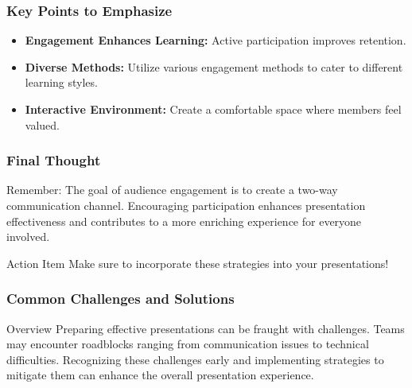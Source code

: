 \documentclass[aspectratio=169]{beamer}
\begin{document}
\begin{frame}[fragile]
    \frametitle{Key Points to Emphasize}
    \begin{itemize}
        \item \textbf{Engagement Enhances Learning:} Active participation improves retention.
        \item \textbf{Diverse Methods:} Utilize various engagement methods to cater to different learning styles.
        \item \textbf{Interactive Environment:} Create a comfortable space where members feel valued.
    \end{itemize}
\end{frame}

\begin{frame}[fragile]
    \frametitle{Final Thought}
    Remember: The goal of audience engagement is to create a two-way communication channel. Encouraging participation enhances presentation effectiveness and contributes to a more enriching experience for everyone involved.

    \begin{block}{Action Item}
        Make sure to incorporate these strategies into your presentations!
    \end{block}
\end{frame}

\begin{frame}[fragile]
    \frametitle{Common Challenges and Solutions}
    \begin{block}{Overview}
        Preparing effective presentations can be fraught with challenges. Teams may encounter roadblocks ranging from communication issues to technical difficulties. Recognizing these challenges early and implementing strategies to mitigate them can enhance the overall presentation experience.
    \end{block}
\end{frame}
\end{document}
